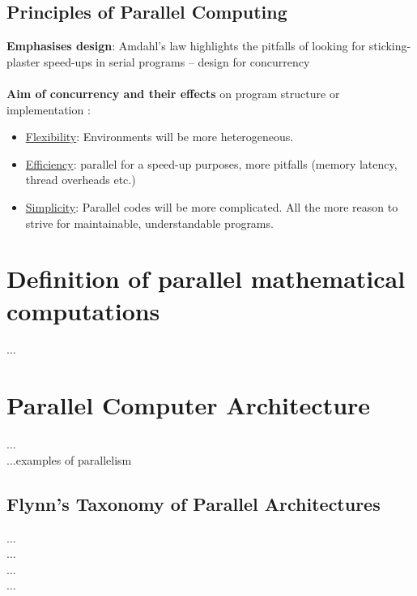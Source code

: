\newpage

\subsection{Principles of Parallel Computing}

\textbf{Emphasises design}:
Amdahl's law highlights the pitfalls of looking for
sticking-plaster speed-ups in serial programs –
design for concurrency \parencite[see][p4]{article6}
\\\\\textbf{Aim of concurrency and their effects} on program structure or implementation \parencite[see][p5]{article6}:
\begin{itemize}
  \item \underline{Flexibility}: Environments will be more heterogeneous.
  \item \underline{Efficiency}:	parallel for a speed-up purposes, more pitfalls (memory latency, thread overheads etc.)
  \item \underline{Simplicity}:	Parallel codes will be more complicated. All the more reason to strive for maintainable, understandable programs.
\end{itemize}

\newpage

\section{Definition of parallel mathematical computations}


...\newpage

\section{Parallel Computer Architecture}

...\parencite[see][p9]{book1} \\
...examples of parallelism \parencite[see][p11]{book1}

\subsection{Flynn's Taxonomy of Parallel Architectures}

...\parencite[see][p5]{internet1}\\
...\parencite[see][p13]{book1}\\
...\parencite[see][p4]{book5}\\
...\parencite[see][p2]{book6}\\

